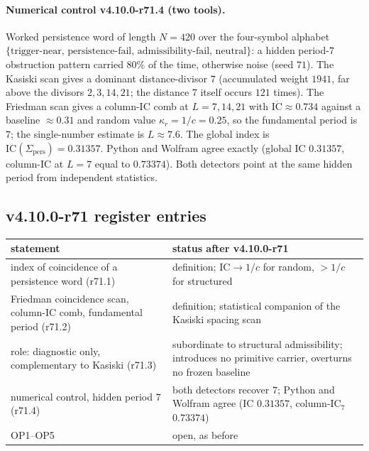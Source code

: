 \paragraph{Numerical control v4.10.0-r71.4 (two tools).}
Worked persistence word of length \(N=420\) over the four-symbol alphabet \(\{\text{trigger-near, persistence-fail,
admissibility-fail, neutral}\}\): a hidden period-\(7\) obstruction pattern carried \(80\%\) of the time, otherwise noise
(seed \(71\)).  The Kasiski scan gives a dominant distance-divisor \(7\) (accumulated weight \(1941\), far above the divisors
\(2,3,14,21\); the distance \(7\) itself occurs \(121\) times).  The Friedman scan gives a column-IC comb at \(L=7,14,21\)
with \(\overline{\mathrm{IC}}\approx0.734\) against a baseline \(\approx0.31\) and random value \(\kappa_r=1/c=0.25\), so the
fundamental period is \(7\); the single-number estimate is \(L\approx 7.6\).  The global index is
\(\mathrm{IC}(\Sigma_{\mathrm{pers}})=0.31357\).  Python and Wolfram agree exactly (global IC \(0.31357\), column-IC at
\(L=7\) equal to \(0.73374\)).  Both detectors point at the same hidden period from independent statistics.

\subsection*{v4.10.0-r71 register entries}
\label{subsec:v4100-r71-register}

\begin{center}
\small
\begin{tabular}{@{}>{\raggedright\arraybackslash}p{}>{\raggedright\arraybackslash}p{}@{}}
\toprule
statement & status after v4.10.0-r71\\
\midrule
index of coincidence of a persistence word (r71.1) & definition; \(\mathrm{IC}\to1/c\) for random, \(>1/c\) for structured\\
Friedman coincidence scan, column-IC comb, fundamental period (r71.2) & definition; statistical companion of the Kasiski spacing scan\\
role: diagnostic only, complementary to Kasiski (r71.3) & subordinate to structural admissibility; introduces no primitive carrier, overturns no frozen baseline\\
numerical control, hidden period \(7\) (r71.4) & both detectors recover \(7\); Python and Wolfram agree (IC \(0.31357\), column-IC\(_7\) \(0.73374\))\\
OP1--OP5 & open, as before\\
\bottomrule
\end{tabular}
\end{center}

